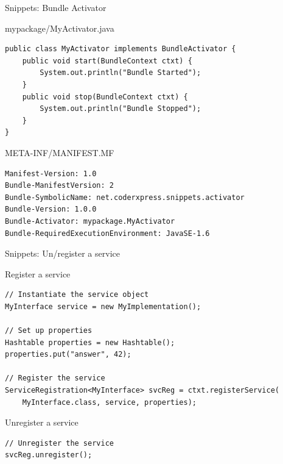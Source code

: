\begin{frame}[fragile]{Snippets: Bundle Activator}
\begin{small}
\begin{block}{mypackage/MyActivator.java}
\begin{verbatim}
public class MyActivator implements BundleActivator {
	public void start(BundleContext ctxt) {
		System.out.println("Bundle Started");
	}
	public void stop(BundleContext ctxt) {
		System.out.println("Bundle Stopped");
	}
}
\end{verbatim}
\vspace{-.8em}
\end{block}
\begin{block}{META-INF/MANIFEST.MF}
\begin{verbatim}
Manifest-Version: 1.0
Bundle-ManifestVersion: 2
Bundle-SymbolicName: net.coderxpress.snippets.activator
Bundle-Version: 1.0.0
Bundle-Activator: mypackage.MyActivator
Bundle-RequiredExecutionEnvironment: JavaSE-1.6
\end{verbatim}
\vspace{-.8em}
\end{block}
\end{small}
\end{frame}


\begin{frame}[fragile]{Snippets: Un/register a service}
\begin{small}
\begin{block}{Register a service}
\begin{verbatim}
// Instantiate the service object
MyInterface service = new MyImplementation();

// Set up properties
Hashtable properties = new Hashtable();
properties.put("answer", 42);

// Register the service
ServiceRegistration<MyInterface> svcReg = ctxt.registerService(
	MyInterface.class, service, properties);
\end{verbatim}
\vspace{-.8em}
\end{block}

\begin{block}{Unregister a service}
\begin{verbatim}
// Unregister the service
svcReg.unregister();
\end{verbatim}
\vspace{-.8em}
\end{block}
\end{small}
\end{frame}

